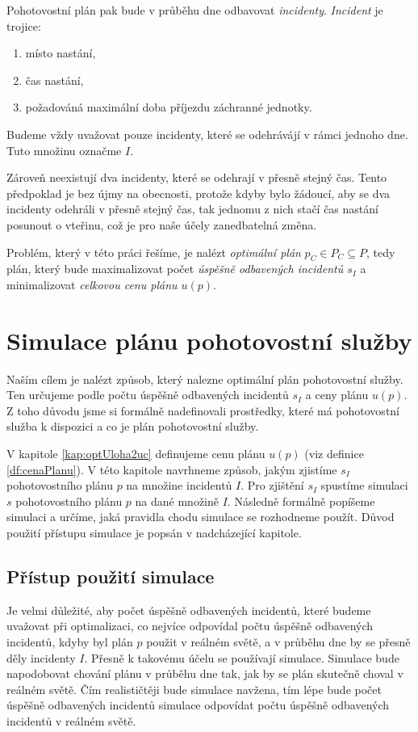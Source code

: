 Pohotovostní plán pak bude v průběhu dne odbavovat \textit{incidenty}.
\textit{Incident} je trojice:
\begin{enumerate}
  \item místo nastání,
  \item čas nastání,
  \item požadováná maximální doba příjezdu záchranné jednotky.
\end{enumerate}
Budeme vždy uvažovat pouze incidenty, které se odehrávájí v rámci jednoho dne. Tuto množinu označme $I$.

Zároveň neexistují dva incidenty, které se odehrají v přesně stejný čas.
Tento předpoklad je bez újmy na obecnosti, protože kdyby bylo žádoucí, aby se dva incidenty odehráli v přesně stejný čas,
tak jednomu z nich stačí čas nastání posunout o vteřinu, což je pro naše účely zanedbatelná změna.

Problém, který v této práci řešíme, je nalézt \textit{optimální plán} $p_C \in P_C \subseteq P$,
tedy plán,
který bude maximalizovat počet \textit{úspěšně odbavených incidentů $s_I$} a minimalizovat \textit{celkovou cenu plánu $u(p)$}.

\section{Simulace plánu pohotovostní služby}\label{SimulaceKap}

Naším cílem je nalézt způsob, který nalezne optimální plán pohotovostní služby.
Ten určujeme podle počtu úspěšně odbavených incidentů $s_I$ a ceny plánu $u(p)$.
Z toho důvodu jsme si formálně nadefinovali prostředky, které má pohotovostní služba k dispozici a co je plán pohotovostní služby.

V kapitole \ref{kap:optUloha2uc} definujeme cenu plánu $u(p)$ (viz definice \ref{df:cenaPlanu}).
V této kapitole navrhneme způsob, jakým zjistíme $s_I$ pohotovostního plánu $p$ na množine incidentů $I$.
Pro zjištění $s_I$ spustíme simulaci $s$ pohotovostního plánu $p$ na dané množině $I$.
Následně formálně popíšeme simulaci a určíme, jaká pravidla chodu simulace se rozhodneme použít.
Důvod použití přístupu simulace je popsán v nadcházející kapitole.

\subsection{Přístup použití simulace}\label{kap:procSimulace}

Je velmi důležité, aby počet úspěšně odbavených incidentů, které budeme uvažovat při optimalizaci, co nejvíce odpovídal počtu úspěšně odbavených incidentů,
kdyby byl plán $p$ použit v reálném světě, a v průběhu dne by se přesně děly incidenty $I$.
Přesně k takovému účelu se používají simulace.
Simulace bude napodobovat chování plánu v průběhu dne tak, jak by se plán skutečně choval v reálném světě.
Čím realističtěji bude simulace navžena, tím lépe bude počet úspěšně odbavených incidentů simulace odpovídat
počtu úspěšně odbavených incidentů v reálném světě.

